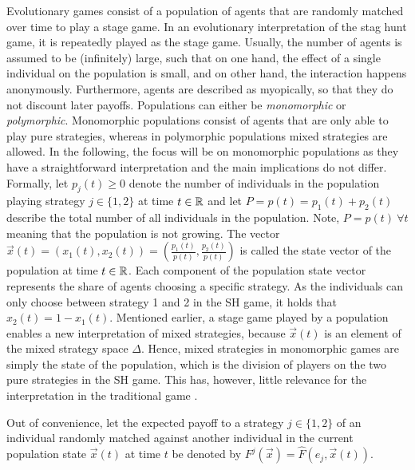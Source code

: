 \label{sec:evolutionarystaghunt}
Evolutionary games consist of a population of agents that are randomly matched 
over time to play a stage game. In an evolutionary interpretation of the
stag hunt game, it is repeatedly played as the stage game.
Usually, the number of agents is assumed to be (infinitely) large, 
such that on one hand, the effect of a single individual 
on the population is small, and on 
other hand, the interaction happens anonymously.
Furthermore, agents are described as myopically, so that they do not 
discount later payoffs.
Populations can either be \textit{monomorphic} or \textit{polymorphic}.
Monomorphic populations consist of agents that are only able to play pure
strategies, whereas in polymorphic populations mixed strategies are allowed.
In the following, the focus will be on monomorphic populations as they have
a straightforward interpretation and the main implications do not differ. 
Formally, let $p_j(t) \geq 0$ denote the number of individuals in 
the population playing strategy $j \in \{1,2\}$ at time $t \in \mathbb{R}$ and 
let $P = p(t) = p_1(t) + p_2(t)$ describe the total number of all individuals 
in the population. Note, $P =p(t)\ \forall t$ meaning that the population 
is not growing. The vector $\vec{x}(t) = \left(x_1(t),x_2(t)\right)
=\left(\frac{p_1(t)}{p(t)},\frac{p_2(t)}{p(t)}\right)$ is called the state 
vector of the population at time $t \in \mathbb{R}$. 
Each component of the population state vector represents the share of agents 
choosing a specific strategy. As the individuals can only choose between 
strategy 1 and 2 in the SH game, it holds that  $x_2(t) = 1-x_1(t)$. 
Mentioned earlier, a stage game played by a population enables a 
new interpretation of mixed strategies, because $\vec{x}(t)$ is an 
element of the mixed strategy space $\Delta$.
Hence, mixed strategies in monomorphic games are simply the state
of the population, which is the division of players on the two
pure strategies in the SH game. 
This has, however, little relevance for the interpretation
in the traditional game \parencite[914-915]{rubinstein_comments_1991}.

Out of convenience, let the expected payoff 
to a strategy $j \in \{1,2\}$ of an individual randomly matched
against another individual in the current population state $\vec{x}(t)$ 
at time $t$ be denoted by $F^j(\vec{x}) = \hat{F}(e_j,\vec{x}(t))$. 

